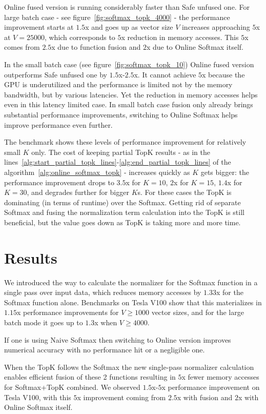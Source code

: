 Online fused version is running considerably faster than Safe unfused one. For large batch case - see figure~\ref{fig:softmax_topk_4000} - the performance improvement starts at $1.5$x and goes up as vector size $V$ increases approaching $5$x at $V=25000$, which corresponds to $5$x reduction in memory accesses. This $5$x comes from $2.5$x due to function fusion and $2$x due to Online Softmax itself.

In the small batch case (see figure~\ref{fig:softmax_topk_10}) Online fused version outperforms Safe unfused one by $1.5$x-$2.5$x. It cannot achieve $5$x because the GPU is underutilized and the performance is limited not by the memory bandwidth, but by various latencies. Yet the reduction in memory accesses helps even in this latency limited case. In small batch case fusion only already brings substantial performance improvements, switching to Online Softmax helps improve performance even further.

The benchmark shows these levels of performance improvement for relatively small $K$ only. The cost of keeping partial TopK results - as in the lines~\ref{alg:start_partial_topk_lines}-\ref{alg:end_partial_topk_lines} of the algorithm~\ref{alg:online_softmax_topk} - increases quickly as $K$ gets bigger: the performance improvement drops to $3.5$x for $K=10$, $2$x for $K=15$, $1.4$x for $K=30$, and degrades further for bigger $K$s. For these cases the TopK is dominating (in terms of runtime) over the Softmax. Getting rid of separate Softmax and fusing the normalization term calculation into the TopK is still beneficial, but the value goes down as TopK is taking more and more time.

\section{Results}

We introduced the way to calculate the normalizer for the Softmax function in a single pass over input data, which reduces memory accesses by $1.33$x for the Softmax function alone. Benchmarks on Tesla V100 show that this materializes in $1.15$x performance improvements for $V\geq 1000$ vector sizes, and for the large batch mode it goes up to $1.3$x when $V\geq 4000$.

If one is using Naive Softmax then switching to Online version improves numerical accuracy with no performance hit or a negligible one.

When the TopK follows the Softmax the new single-pass normalizer calculation enables efficient fusion of these 2 functions resulting in $5$x fewer memory accesses for Softmax+TopK combined. We observed $1.5$x-$5$x performance improvement on Tesla V100, with this $5$x improvement coming from $2.5$x with fusion and $2$x with Online Softmax itself.

